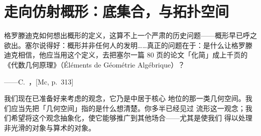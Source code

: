
\chapter{走向仿射概形：底集合，与拓扑空间}
\label{ch:toward-affine-schemes}

\epigraph{格罗滕迪克如何想出概形的定义，这算不上一个严肃的历史问题——概形早已呼之欲出。塞尔说得好：概形并非任何人的发明……真正的问题在于：是什么让格罗滕迪克相信，他应当用这个定义，去把塞尔一篇 80 页的论文「化简」成上千页的《代数几何原理》（Éléments de Géométrie Algébrique）？}{——C.~\trMcLarty，[Mc, p.~313]}


我们现在已准备好来考虑\emph{\trScheme}的观念，它乃是\trAlgebraicGeometry{}中居于核心
地位的那一类几何空间。我们应当先把「几何空间」指的是什么想清楚。你多半已经见过
流形这一观念；我们希望将这个观念抽象化，使它能够推广到其他场合——尤其是使我们
得以处理非光滑的对象与算术的对象。








